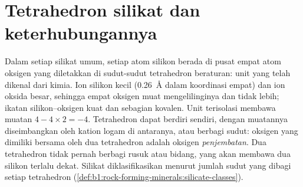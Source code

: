 \section{Tetrahedron silikat dan keterhubungannya}

Dalam setiap silikat umum, setiap atom silikon berada di pusat empat atom oksigen yang diletakkan di sudut-sudut tetrahedron beraturan: unit  yang telah dikenal dari kimia. Ion silikon kecil (\qty{0.26}{\angstrom} dalam koordinasi empat) dan ion oksida besar, sehingga empat oksigen muat mengelilinginya dan tidak lebih; ikatan silikon--oksigen kuat dan sebagian kovalen. Unit terisolasi membawa muatan $4 - 4\times2 = -4$.
Tetrahedron dapat berdiri sendiri, dengan muatannya diseimbangkan oleh kation logam di antaranya, atau berbagi sudut: oksigen yang dimiliki bersama oleh dua tetrahedron adalah oksigen \emph{penjembatan}. Dua tetrahedron tidak pernah berbagi rusuk atau bidang, yang akan membawa dua silikon terlalu dekat. Silikat diklasifikasikan menurut jumlah sudut yang dibagi setiap tetrahedron (\cref{def:b1:rock-forming-minerals:silicate-classes}).

